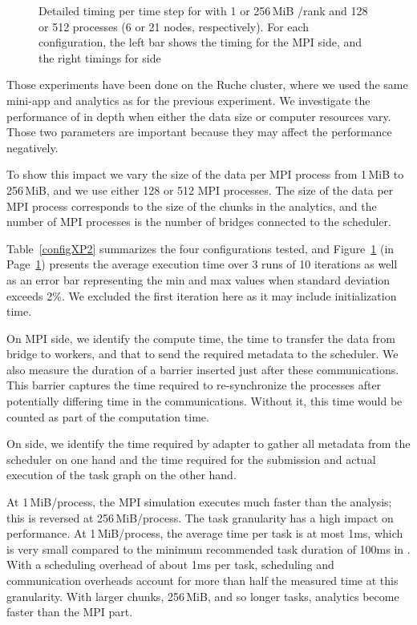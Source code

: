 \begin{figure}[h]\centering

\caption{\label{XP2_time}Detailed timing per time step for \deisa with 1 or 256\,MiB /rank and 128 or 512 processes (6 or 21 nodes, respectively).
For each configuration, the left bar shows the timing for the MPI side, and the right timings for \dask side}
\end{figure}

Those experiments have been done on the Ruche cluster, where we used the same mini-app and analytics as for the previous experiment.
We investigate the performance of \deisa in depth when either the data size or computer resources vary. Those two parameters are important because they may affect the \dask performance negatively. 

To show this impact we vary the size of the data per MPI process from 1\,MiB to 256\,MiB, and we use either 128 or 512 MPI processes.
The size of the data per MPI process corresponds to the size of the chunks in the \dask analytics, and the number of MPI processes is the number of bridges connected to the scheduler.

Table~\ref{configXP2} summarizes the four configurations tested, and Figure~\ref{XP2_time} (in Page~\ref{XP2_time}) presents the average execution time over 3 runs of 10 iterations as well as an error bar representing the min and max values when standard deviation exceeds 2\%. We excluded the first iteration here as it may include initialization time.

On MPI side, we identify the compute time, the time to transfer the data from \deisa bridge to \dask workers, and that to send the required metadata to the scheduler.
We also measure the duration of a barrier inserted just after these communications.
This barrier captures the time required to re-synchronize the processes after potentially differing time in the communications.
Without it, this time would be counted as part of the computation time.

On \dask side, we identify the time required by \deisa adapter to gather all metadata from the scheduler on one hand and the time required for the submission and actual execution of the task graph on the other hand.

At 1\,MiB/process, the MPI simulation executes much faster than the analysis; this is reversed at 256\,MiB/process.
The task granularity has a high impact on \dask performance. At 1\,MiB/process, the average time per task is at most 1ms, which is very small compared to the minimum recommended task duration of 100ms\cite{noauthor_dask_chunk} in \dask. 
With a scheduling overhead of about 1ms per task, scheduling and communication overheads account for more than half the measured time at this granularity.
With larger chunks, 256\,MiB, and so longer tasks, \dask analytics become faster than the MPI part.

